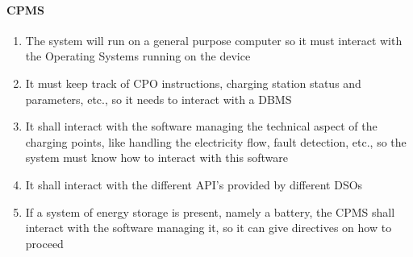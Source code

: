 \paragraph{CPMS}
\begin{enumerate}
    \item The system will run on a general purpose computer so it must interact with the Operating Systems running on the device
    \item It must keep track of CPO instructions, charging station status and parameters, etc., so it needs to interact with a DBMS
    \item It shall interact with the software managing the technical aspect of the charging points, like handling the electricity flow, fault detection, etc., so the system must know how to interact with this software
    \item It shall interact with the different API's provided by different DSOs
    \item If a system of energy storage is present, namely a battery, the CPMS shall interact with the software managing it, so it can give directives on how to proceed
\end{enumerate}